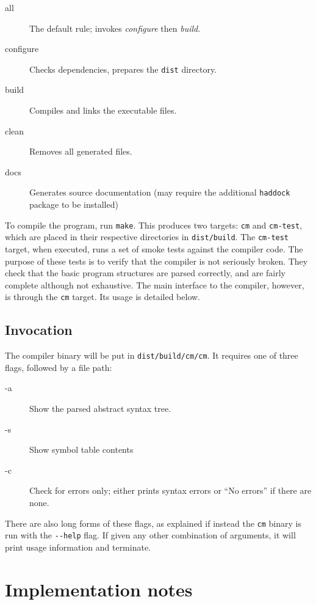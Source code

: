 \documentclass[12pt]{amsart}
\begin{document}
\begin{description}
\item[all] The default rule; invokes \emph{configure} then
  \emph{build}. 
\item[configure] Checks dependencies, prepares the \verb|dist| directory.
\item[build] Compiles and links the executable files.
\item[clean] Removes all generated files.
\item[docs] Generates source documentation (may require the additional
  \verb|haddock| package to be installed)
\end{description}

To compile the program, run \verb|make|. This produces two targets:
\verb|cm| and \verb|cm-test|, which are placed in their respective
directories in \verb|dist/build|. The \verb|cm-test| target, when
executed, runs a set of smoke tests against the compiler code. The
purpose of these tests is to verify that the compiler is not seriously
broken. They check that the basic program structures are parsed
correctly, and are fairly complete although not exhaustive. The main
interface to the compiler, however, is through the \verb|cm|
target. Its usage is detailed below.

\subsection{Invocation}
The compiler binary will be put in \verb|dist/build/cm/cm|. It
requires one of three flags, followed by a file path:

\begin{description}
\item[-a] Show the parsed abstract syntax tree.
\item[-s] Show symbol table contents
\item[-c] Check for errors only; either prints syntax errors or ``No
  errors'' if there are none.
\end{description}

There are also long forms of these flags, as explained if instead the
\verb|cm| binary is run with the \verb|--help| flag. If given any
other combination of arguments, it will print usage information and
terminate.


\section{Implementation notes}
\label{implementation}
\end{document}
